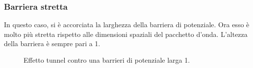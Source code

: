  \subsubsection{Barriera stretta}
 In questo caso, si è accorciata la larghezza della barriera di potenziale. Ora esso è molto più stretta rispetto alle dimensioni spaziali del pacchetto d'onda.
 L'altezza della barriera è sempre pari a 1.
\begin{figure}[hp]
 \centering
  \caption{Effetto tunnel contro una barrieri di potenziale larga 1.} 
 \end{figure}
